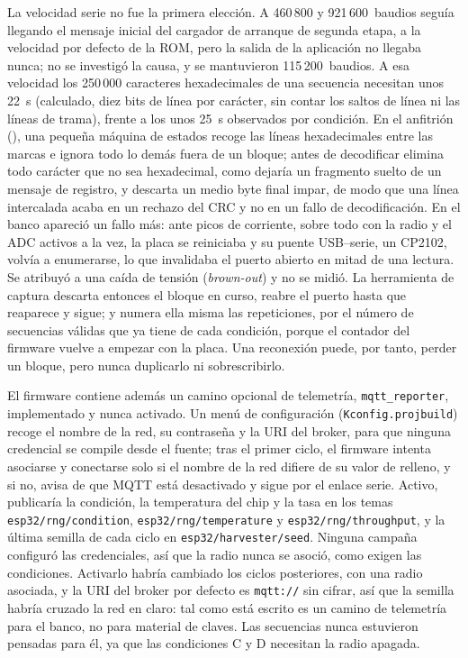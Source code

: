 La velocidad serie no fue la primera elección. A 460\,800 y
921\,600~baudios seguía llegando el mensaje inicial del cargador de
arranque de segunda etapa, a la velocidad por defecto de la ROM, pero la
salida de la aplicación no llegaba nunca; no se investigó la causa, y se
mantuvieron 115\,200~baudios. A esa velocidad los 250\,000 caracteres
hexadecimales de una secuencia necesitan unos 22~s (calculado, diez bits
de línea por carácter, sin contar los saltos de línea ni las líneas de
trama), frente a los unos 25~s observados por condición. En el anfitrión
(), una pequeña máquina de estados
recoge las líneas hexadecimales entre las marcas e ignora todo lo demás
fuera de un bloque; antes de decodificar elimina todo carácter que no sea
hexadecimal, como dejaría un fragmento suelto de un mensaje de registro, y
descarta un medio byte final impar, de modo que una línea intercalada
acaba en un rechazo del CRC y no en un fallo de decodificación. En el
banco apareció un fallo más: ante picos de corriente, sobre todo con la
radio y el ADC activos a la vez, la placa se reiniciaba y su puente
USB--serie, un CP2102, volvía a enumerarse, lo que invalidaba el puerto
abierto en mitad de una lectura. Se atribuyó a una caída de tensión
(\emph{brown-out}) y no se midió. La herramienta de captura descarta
entonces el bloque en curso, reabre el puerto hasta que reaparece y
sigue; y numera ella misma las repeticiones, por el número de secuencias
válidas que ya tiene de cada condición, porque el contador del firmware
vuelve a empezar con la placa. Una reconexión puede, por tanto, perder un
bloque, pero nunca duplicarlo ni sobrescribirlo.

El firmware contiene además un camino opcional de telemetría,
\texttt{mqtt\_reporter}, implementado y nunca activado. Un menú de
configuración (\texttt{Kconfig.projbuild}) recoge el nombre de la red, su
contraseña y la URI del broker, para que ninguna credencial se compile
desde el fuente; tras el primer ciclo, el firmware intenta asociarse y
conectarse solo si el nombre de la red difiere de su valor de relleno, y
si no, avisa de que MQTT está desactivado y sigue por el enlace serie.
Activo, publicaría la condición, la temperatura del chip y la tasa en los
temas \texttt{esp32/rng/condition}, \texttt{esp32/rng/temperature} y
\texttt{esp32/rng/throughput}, y la última semilla de cada ciclo en
\texttt{esp32/harvester/seed}. Ninguna campaña configuró las
credenciales, así que la radio nunca se asoció, como exigen las
condiciones. Activarlo habría cambiado los ciclos posteriores, con una
radio asociada, y la URI del broker por defecto es \texttt{mqtt://} sin
cifrar, así que la semilla habría cruzado la red en claro: tal como está
escrito es un camino de telemetría para el banco, no para material de
claves. Las secuencias nunca estuvieron pensadas para él, ya que las
condiciones C y D necesitan la radio apagada.

